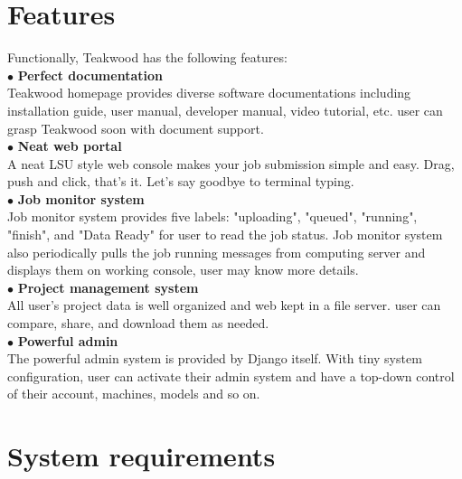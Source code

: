 \section{Features}
Functionally, Teakwood has the following features:\\

$\bullet$ \textbf{Perfect documentation}\\
Teakwood homepage provides diverse software documentations including installation guide, user manual, developer manual, video tutorial, etc. user can grasp Teakwood soon with document support.\\

$\bullet$ \textbf{Neat web portal}\\
A neat LSU style web console makes your job submission simple and easy. Drag, push and click, that's it. Let's say goodbye to terminal typing.\\

$\bullet$ \textbf{Job monitor system}\\
Job monitor system provides five labels: "uploading", "queued", "running", "finish", and "Data Ready" for user to read the job status. Job monitor system also periodically pulls the job running messages from computing server and displays them on working console, user may know more details.\\

$\bullet$ \textbf{Project management system}\\
All user's project data is well organized and web kept in a file server. user can compare, share, and download them as needed.\\

$\bullet$ \textbf{Powerful admin}\\
The powerful admin system is provided by Django itself. With tiny system configuration, user can activate their admin system and have a top-down control of their account, machines, models and so on.\\


\section{System requirements}

